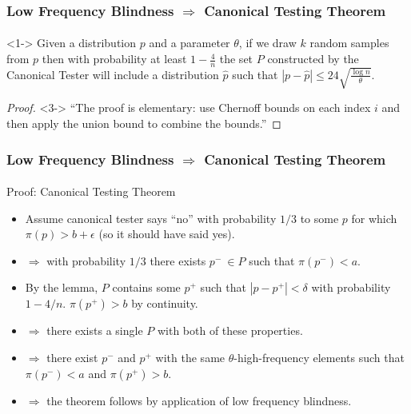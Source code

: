 \documentclass{beamer}
\begin{document}
\begin{frame}
  \frametitle{Low Frequency Blindness $\Rightarrow$ Canonical Testing
    Theorem} \framesubtitle{}
  \begin{lemma}<1->
    Given a distribution $p$ and a parameter $\theta$, if we draw $k$
    random samples from $p$ then with probability at least
    $1-\frac{4}{n}$ the set $P$ constructed by the Canonical Tester
    will include a distribution $\hat{p}$ such that $|p-\hat p
    |\le 24\sqrt{\frac{\log n}{\theta}}$.
  \end{lemma}
  \begin{proof}<3->
    ``The proof is elementary: use Chernoff bounds on each index $i$
    and then apply the union bound to combine the bounds.''
  \end{proof}
\end{frame}


\begin{frame}
  \frametitle{Low Frequency Blindness $\Rightarrow$ Canonical Testing
    Theorem} \framesubtitle{}

  
  \begin{block}{Proof: Canonical Testing Theorem}
    \begin{itemize}
    \item<2-> Assume canonical tester says ``no'' with probability $1/3$
      to some $p$ for which $\pi(p)>b+\epsilon$ (so it should have
      said yes).
    \item<3-> $\Rightarrow$ with probability $1/3$ there exists $p^-\ \in
      P$ such that $\pi(p^-)<a$.
    \item<4-> By the lemma, $P$ contains some $p^+$ such that
      $|p-p^+|<\delta$ with probability $1-4/n$. $\pi(p^+)>b$ by continuity.
    \item<5-> $\Rightarrow$ there exists a single $P$ with both of these
      properties.
    \item<6-> $\Rightarrow$ there exist $p^-$ and $p^+$ with the same
      $\theta$-high-frequency elements such that $\pi(p^-)<a$ and $\pi(p^+)>b$.
    \item<7-> $\Rightarrow$ the theorem follows by application of low
      frequency blindness.
    \end{itemize}
  \end{block}
\end{frame}
\end{document}
